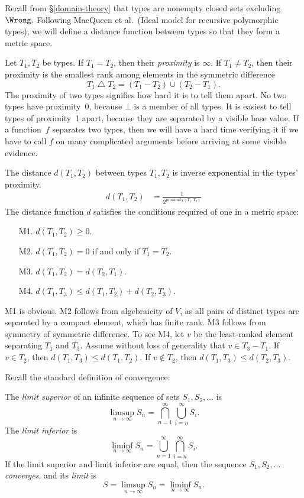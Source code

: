 \documentclass{amsart}
\begin{document}

Recall from \S\ref{domain-theory} that types are nonempty closed
sets excluding $\Wrong$. Following MacQueen et al.\ (Ideal model
for recursive polymorphic types), we will define a distance
function between types so that they form a metric space.

Let $T_1,T_2$ be types. If $T_1=T_2$, then their \emph{proximity}
is $\infty$. If $T_1\neq T_2$, then their proximity is the
smallest rank among elements in the symmetric difference
\[
T_1 \operatorname\triangle T_2 = (T_1 - T_2)\cup (T_2 - T_1).
\]
The proximity of two types signifies how hard it is to tell them
apart. No two types have proximity~0, because $\bot$ is a member
of all types. It is easiest to tell types of proximity~1 apart,
because they are separated by a visible base value. If a
function~$f$ separates two types, then we will have a hard time
verifying it if we have to call $f$ on many complicated arguments
before arriving at some visible evidence.

The distance $d(T_1, T_2)$ between types $T_1, T_2$ is inverse
exponential in the types' proximity.
\begin{align}
\label{distance}
d(T_1,T_2)
&=\frac{1}{2^{\mathrm{proximity}(T_1,T_2)}}
\end{align}
The distance function $d$ satisfies the conditions required of
one in a metric space:
\begin{enumerate}\itemsep=1ex
\item [M1.] $d(T_1,T_2)\ge0$.
\item [M2.] $d(T_1,T_2)=0$ if and only if $T_1=T_2$.
\item [M3.] $d(T_1,T_2)=d(T_2,T_1)$.
\item [M4.] $d(T_1,T_3)\le d(T_1,T_2)+d(T_2,T_3)$.
\end{enumerate}
M1 is obvious. M2 follows from algebraicity of $V$, as all pairs
of distinct types are separated by a compact element, which has
finite rank. M3 follows from symmetry of symmetric difference. To
see M4, let $v$ be the least-ranked element separating $T_1$ and
$T_3$. Assume without loss of generality that $v\in T_3-T_1$. If
$v\in T_2$, then $d(T_1,T_3)\le d(T_1, T_2)$. If $v\notin T_2$,
then $d(T_1, T_3)\le d(T_2, T_3)$.


Recall the standard definition of convergence:

The \emph{limit superior} of an infinite sequence of sets
$S_1,S_2,\ldots$ is
\[
\limsup_{n\rightarrow\infty}S_n =
\bigcap_{n=1}^\infty\bigcup_{i = n}^\infty S_i.
\]
The \emph{limit inferior} is
\[
\liminf_{n\rightarrow\infty}S_n =
\bigcup_{n=1}^\infty\bigcap_{i = n}^\infty S_i.
\]
If the limit superior and limit inferior are equal, then the
sequence $S_1,S_2,\ldots$ \emph{converges}, and its \emph{limit}
is
\[
S = \limsup_{n\rightarrow\infty}S_n = \liminf_{n\rightarrow\infty}S_n.
\]
\end{document}
